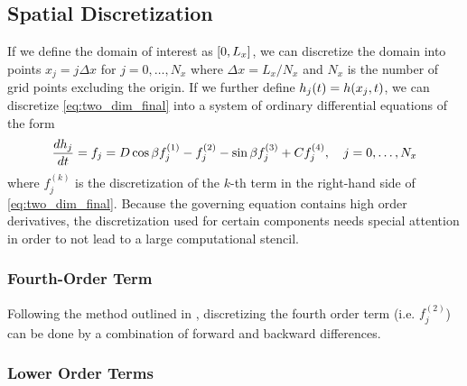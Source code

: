 \subsection{Spatial Discretization}
If we define the domain of interest as $\left[ 0, L_x \right]$, we can discretize the 
domain into points $x_j = j\Delta x$ for $j = 0, \ldots, N_x$ where 
$\Delta x = L_x / N_x$ and $N_x$ is the number of grid points excluding the origin. 
If we further define $h_j\!\left( t \right) = h\!\left( x_j, t \right)$, we can discretize 
\cref{eq:two_dim_final} into a system of ordinary differential equations of the form 
\begin{equation}
    \frac{d h_j}{d t} = f_j = D\cos \beta f_j^{(1)} - f_j^{(2)} - \sin \beta f_j^{(3)} + C f_j^{(4)}, \quad j = 0, \ldots, N_x
    \label{eq:ode_sys}
\end{equation}
where $f_j^{(k)}$ is the discretization of the $k$-th term in
the right-hand side of \cref{eq:two_dim_final}. Because the governing equation 
contains high order derivatives, the discretization used for certain components 
needs special attention in order to not lead to a large computational stencil.

\subsubsection{Fourth-Order Term}
Following the method outlined in \cite{kondic2003instabilities}, discretizing the fourth order term (i.e.\! $f_j^{(2)}$) can be done by a combination
of forward and backward differences. 

\subsubsection{Lower Order Terms}
